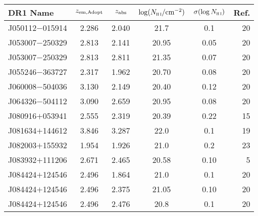 \begin{table}
\begin{center}
{\footnotesize 
\begin{tabular}{lccccr}
\hline
DR1 Name & $z_{\rm em,Adopt}$ & $z_\textrm{\scriptsize abs}$ & $\log(N_\textsc{h\scriptsize{\,i}}/\textrm{cm}^{-2})$ & $\sigma(\log N_\textsc{h\scriptsize{\,i}})$ & Ref. \\
\hline
 J050112$-$015914 &      2.286 &                    2.040 &                    21.7 &                0.1 &                20 \\
 J053007$-$250329 &      2.813 &                    2.141 &                   20.95 &               0.05 &                20 \\
 J053007$-$250329 &      2.813 &                    2.811 &                   21.35 &               0.07 &                20 \\
 J055246$-$363727 &      2.317 &                    1.962 &                   20.70 &               0.08 &                20 \\
 J060008$-$504036 &      3.130 &                    2.149 &                   20.40 &               0.12 &                20 \\
 J064326$-$504112 &      3.090 &                    2.659 &                   20.95 &               0.08 &                20 \\
 J080916$+$053941 &      2.555 &                    2.319 &                   20.39 &               0.22 &                15 \\
 J081634$+$144612 &      3.846 &                    3.287 &                    22.0 &                0.1 &                19 \\
 J082003$+$155932 &      1.954 &                    1.926 &                    21.0 &                0.2 &                23 \\
 J083932$+$111206 &      2.671 &                    2.465 &                   20.58 &               0.10 &                 5 \\
 J084424$+$124546 &      2.496 &                    1.864 &                   21.0  &               0.1  &                20 \\
 J084424$+$124546 &      2.496 &                    2.375 &                   21.05 &               0.10 &                20 \\
 J084424$+$124546 &      2.496 &                    2.476 &                   20.8  &               0.1  &                20 \\

\end{tabular}}
\end{center}
\end{table}
